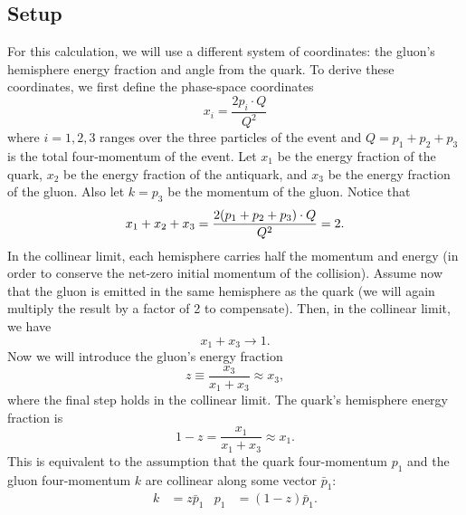 \documentclass[../thesis.tex]{subfiles}
\begin{document}
\subsection{Setup}
	For this calculation, we will use a different system of coordinates: the gluon's hemisphere energy fraction and angle from the quark. To derive these coordinates, we first define the phase-space coordinates
	\begin{equation}
		x_i = \frac{2 p_i \cdot Q}{Q^2}
	\end{equation}
	where $i = 1, 2, 3$ ranges over the three particles of the event and $Q = p_1 + p_2 + p_3$ is the total four-momentum of the event. Let $x_1$ be the energy fraction of the quark, $x_2$ be the energy fraction of the antiquark, and $x_3$ be the energy fraction of the gluon. Also let $k = p_3$ be the momentum of the gluon. Notice that
	\begin{equation}
		x_1 + x_2 + x_3 = \frac{2\qty(p_1 + p_2 + p_3)\cdot Q}{Q^2} = 2.
	\end{equation}
	In the collinear limit, each hemisphere carries half the momentum and energy (in order to conserve the net-zero initial momentum of the collision). Assume now that the gluon is emitted in the same hemisphere as the quark (we will again multiply the result by a factor of 2 to compensate). Then, in the collinear limit, we have
	\begin{equation}
		x_1 + x_3 \to 1.
	\end{equation}
	Now we will introduce the gluon's energy fraction
	\begin{equation}
		z \equiv \frac{x_3}{x_1 + x_3} \approx x_3,
	\end{equation}
	where the final step holds in the collinear limit. The quark's hemisphere energy fraction is
	\begin{equation}
		1 - z = \frac{x_1}{x_1 + x_3} \approx x_1.
	\end{equation}
	This is equivalent to the assumption that the quark four-momentum $p_1$ and the gluon four-momentum $k$ are collinear along some vector $\bar p_1$:
	\begin{align}
		k &= z \bar p_1 & p_1 &= (1 - z)\bar p_1.
	\end{align}
\end{document}
